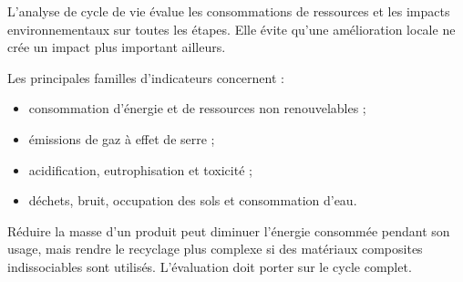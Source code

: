 L'analyse de cycle de vie évalue les consommations de ressources et les impacts environnementaux sur toutes les étapes. Elle évite qu'une amélioration locale ne crée un impact plus important ailleurs.

Les principales familles d'indicateurs concernent :
\begin{itemize}
  \item consommation d'énergie et de ressources non renouvelables ;
  \item émissions de gaz à effet de serre ;
  \item acidification, eutrophisation et toxicité ;
  \item déchets, bruit, occupation des sols et consommation d'eau.
\end{itemize}

\begin{ISapplication}[title={Éco-conception}]
Réduire la masse d'un produit peut diminuer l'énergie consommée pendant son usage, mais rendre le recyclage plus complexe si des matériaux composites indissociables sont utilisés. L'évaluation doit porter sur le cycle complet.
\end{ISapplication}
